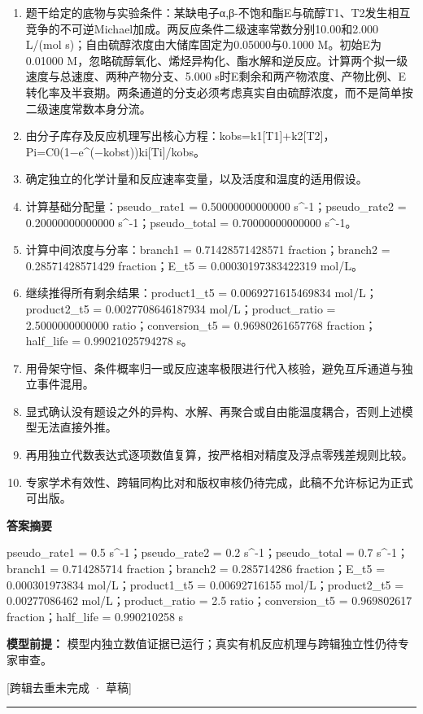 \documentclass[UTF8,11pt,a4paper]{ctexart}
\begin{document}
\begin{enumerate}
\item 题干给定的底物与实验条件：某缺电子α,β-不饱和酯E与硫醇T1、T2发生相互竞争的不可逆Michael加成。两反应条件二级速率常数分别10.00和2.000 L/(mol s)；自由硫醇浓度由大储库固定为0.05000与0.1000 M。初始E为0.01000 M，忽略硫醇氧化、烯烃异构化、酯水解和逆反应。计算两个拟一级速度与总速度、两种产物分支、5.000 s时E剩余和两产物浓度、产物比例、E转化率及半衰期。两条通道的分支必须考虑真实自由硫醇浓度，而不是简单按二级速度常数本身分流。
\item 由分子库存及反应机理写出核心方程：kobs=k1[T1]+k2[T2]，Pi=C0(1−e\textasciicircum{}(−kobst))ki[Ti]/kobs。
\item 确定独立的化学计量和反应速率变量，以及活度和温度的适用假设。
\item 计算基础分配量：pseudo\_rate1 = 0.50000000000000 s\textasciicircum{}-1；pseudo\_rate2 = 0.20000000000000 s\textasciicircum{}-1；pseudo\_total = 0.70000000000000 s\textasciicircum{}-1。
\item 计算中间浓度与分率：branch1 = 0.71428571428571 fraction；branch2 = 0.28571428571429 fraction；E\_t5 = 0.00030197383422319 mol/L。
\item 继续推得所有剩余结果：product1\_t5 = 0.0069271615469834 mol/L；product2\_t5 = 0.0027708646187934 mol/L；product\_ratio = 2.5000000000000 ratio；conversion\_t5 = 0.96980261657768 fraction；half\_life = 0.99021025794278 s。
\item 用骨架守恒、条件概率归一或反应速率极限进行代入核验，避免互斥通道与独立事件混用。
\item 显式确认没有题设之外的异构、水解、再聚合或自由能温度耦合，否则上述模型无法直接外推。
\item 再用独立代数表达式逐项数值复算，按严格相对精度及浮点零残差规则比较。
\item 专家学术有效性、跨辑同构比对和版权审核仍待完成，此稿不允许标记为正式可出版。
\end{enumerate}
\noindent\textbf{答案摘要}\par
pseudo\_rate1 = 0.5 s\textasciicircum{}-1；pseudo\_rate2 = 0.2 s\textasciicircum{}-1；pseudo\_total = 0.7 s\textasciicircum{}-1；branch1 = 0.714285714 fraction；branch2 = 0.285714286 fraction；E\_t5 = 0.000301973834 mol/L；product1\_t5 = 0.00692716155 mol/L；product2\_t5 = 0.00277086462 mol/L；product\_ratio = 2.5 ratio；conversion\_t5 = 0.969802617 fraction；half\_life = 0.990210258 s\par
\noindent\textbf{模型前提：}
模型内独立数值证据已运行；真实有机反应机理与跨辑独立性仍待专家审查。\par
\noindent\textcolor{red!65!black}{[跨辑去重未完成 · 草稿]} \par
\medskip\hrule\medskip
{}
\end{document}

